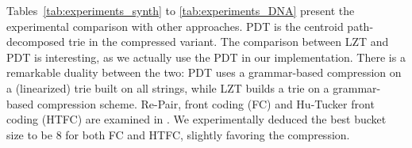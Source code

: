 \documentclass{llncs}
\begin{document}
Tables~\ref{tab:experiments_synth} to \ref{tab:experiments_DNA} present the experimental comparison with other approaches.
PDT is the centroid path-decomposed trie \cite{grossi12fast} in the compressed variant. The comparison between LZT and PDT is interesting, as we actually use the PDT in our implementation. There is a remarkable duality between the two: PDT uses a grammar-based compression on a (linearized) trie built on all strings, while LZT builds a trie on a grammar-based compression scheme.
Re-Pair, front coding (FC) and Hu-Tucker front coding (HTFC) are examined in \cite{brisaboa11compressed}.
We experimentally deduced the best bucket size to be 8 for both FC and HTFC, slightly favoring the compression.

\begin{table}[t]
\caption{Comparison of our data structure with others.}
\centering
{}
\qquad
{}


\end{table}
\end{document}

